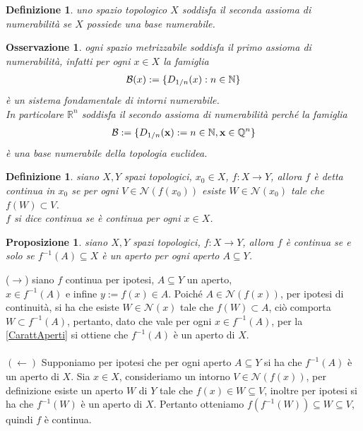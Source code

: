 \documentclass[oneside, 11pt]{amsbook}
\makeatletter
\newcommand{\0}{{(0)}}
\newcommand{\3}{{(3)}}
\theoremstyle{colonplain}
\newtheorem{prop}[thm]{Proposizione}
\theoremstyle{colondefinition}
\newtheorem{defn}[thm]{Definizione}
\theoremstyle{colonremark}
\newtheorem{rmk}[thm]{Osservazione}
\numberwithin{equation}{chapter}
\renewcommand{\proofname}{Dimostrazione}
\renewenvironment{proof}[1][\proofname]{\par
  \pushQED{\qed}%
  \normalfont \topsep6\p@\@plus6\p@\relax
  \trivlist
  \item[\hskip\labelsep\bfseries #1:]\ignorespaces
}{%
  \popQED\endtrivlist\@endpefalse
}
\makeatother
\begin{document}
\begin{defn}
uno spazio topologico $X$ soddisfa il \textit{seconda assioma di numerabilità} se $X$ possiede una base numerabile.
\end{defn}
\begin{rmk}
ogni spazio metrizzabile soddisfa il primo assioma di numerabilità, infatti per ogni $x \in X$ la famiglia
\begin{align}
    \mathcal{B}(x) := \{ D_{1/n}(x) : n \in \mathbb{N} \} \notag
\end{align}
è un sistema fondamentale di intorni numerabile. \\
In particolare $\mathbb{R}^n$ soddisfa il secondo assioma di numerabilità perché la famiglia
\begin{align}
    \mathcal{B} := \{ D_{1/n}(\mathbf{x}) := n \in \mathbb{N}, \mathbf{x} \in \mathbb{Q}^n \} \notag
\end{align}
è una base numerabile della topologia euclidea.
\end{rmk}
\begin{defn}
siano $X, Y$ spazi topologici, $x_0 \in X$, $f : X \longrightarrow Y$, allora $f$ è detta \textit{continua} in $x_0$ se per ogni $V \in \mathcal{N}(f(x_0))$ esiste $W \in \mathcal{N}(x_0)$ tale che $f(W) \subset V$. \\
$f$ si dice \textit{continua} se è continua per ogni $x \in X$.
\end{defn}
\begin{prop}\label{CarattFunzCont}
siano $X, Y$ spazi topologici, $f : X \longrightarrow Y$, allora $f$ è continua se e solo se $f^{-1}(A) \subseteq X$ è un aperto per ogni aperto $A \subseteq Y$.
\end{prop}
\begin{proof}
($\rightarrow$) siano $f$ continua per ipotesi, $A \subseteq Y$ un aperto, \\ $x \in f^{-1}(A)$ e infine $y := f(x) \in A$. Poiché $A \in \mathcal{N}(f(x))$, per ipotesi di continuità, si ha che esiste $W \in \mathcal{N}(x)$ tale che $f(W) \subset A$, ciò comporta $W \subset f^{-1}(A)$, pertanto, dato che vale per ogni $x \in f^{-1}(A)$, per la \ref{CarattAperti} si ottiene che $f^{-1}(A)$ è un aperto di $X$. \\ \\
$(\leftarrow)$ Supponiamo per ipotesi che per ogni aperto $A \subseteq Y$ si ha che $f^{-1}(A)$ è un aperto di $X$. Sia $x \in X$, consideriamo un intorno $V \in \mathcal{N}(f(x))$, per definizione esiste un aperto $W$ di $Y$ tale che $f(x) \in W \subseteq V$, inoltre per ipotesi si ha che $f^{-1}(W)$ è un aperto di $X$. Pertanto otteniamo $f(f^{-1}(W)) \subseteq W \subseteq V$, quindi $f$ è continua.
\end{proof}
\end{document}

